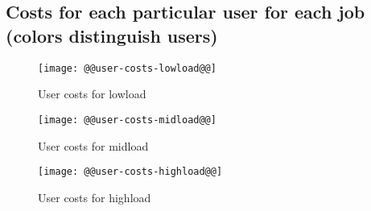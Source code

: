 \documentclass[11pt]{article}
\begin{document}
\newpage
\subsection{Costs for each particular user for each job (colors distinguish users)}
\begin{figure}[htbp]
  \begin{center}
    \texttt{[image: @@user-costs-lowload@@]}
    \caption{User costs for lowload}
    \label{fig:user-costs-lowload}
  \end{center}
\end{figure}
\begin{figure}[htbp]
  \begin{center}
    \texttt{[image: @@user-costs-midload@@]}
    \caption{User costs for midload}
    \label{fig:user-costs-midload}
  \end{center}
\end{figure}
\begin{figure}[htbp]
  \begin{center}
    \texttt{[image: @@user-costs-highload@@]}
    \caption{User costs for highload}
    \label{fig:user-costs-highload}
  \end{center}
\end{figure}
\end{document}
